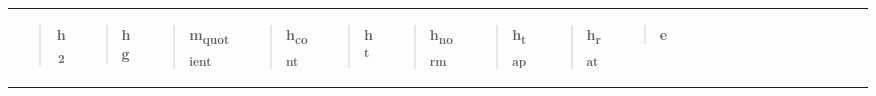 \begin{longtable}[]{@{}clllllllllllllllllll@{}}
\begin{minipage}[b]{0.05\columnwidth}
\begin{quote}
\textbf{h\textsubscript{2}}
\end{quote}\strut
\end{minipage} & \begin{minipage}[b]{0.05\columnwidth}\raggedright\strut
\begin{quote}
\textbf{hg}
\end{quote}\strut
\end{minipage} & \begin{minipage}[b]{0.05\columnwidth}\raggedright\strut
\begin{quote}
\textbf{m\textsubscript{quotient}}
\end{quote}\strut
\end{minipage} & \begin{minipage}[b]{0.05\columnwidth}\raggedright\strut
\begin{quote}
\textbf{h\textsubscript{cont}}
\end{quote}\strut
\end{minipage} & \begin{minipage}[b]{0.05\columnwidth}\raggedright\strut
\begin{quote}
\textbf{h\textsuperscript{t}}
\end{quote}\strut
\end{minipage} & \begin{minipage}[b]{0.05\columnwidth}\raggedright\strut
\begin{quote}
\textbf{h\textsubscript{norm}}
\end{quote}\strut
\end{minipage} & \begin{minipage}[b]{0.05\columnwidth}\raggedright\strut
\begin{quote}
\textbf{h\textsubscript{tap}}
\end{quote}\strut
\end{minipage} & \begin{minipage}[b]{0.05\columnwidth}\raggedright\strut
\begin{quote}
\textbf{h\textsubscript{rat}}
\end{quote}\strut
\end{minipage} & \begin{minipage}[b]{0.05\columnwidth}\raggedright\strut
\begin{quote}
\textbf{e}
\end{quote}\strut
\end{minipage} & \begin{minipage}[b]{0.05\columnwidth}\raggedright\strut
\begin{quote}

\end{quote}
\end{minipage}
\end{longtable}
